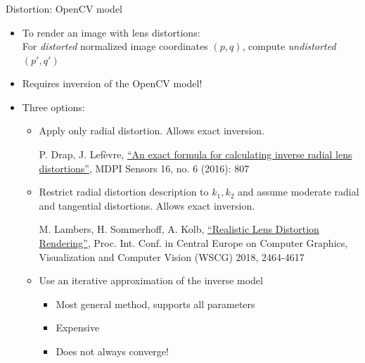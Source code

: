 \documentclass[utf8,stillsansserifmath,fleqn,t]{beamer}
\newcommand{\literature}[1]{{\tiny #1 \par}}
\begin{document}
\begin{frame}[label=distortion-opencv]
\frametitle{\insertsection}
Distortion: OpenCV model
\begin{itemize}
\item To render an image with lens distortions:\\
    For \emph{distorted} normalized image coordinates $(p,q)$, compute \emph{undistorted}
    $(p',q')$
\item Requires inversion of the OpenCV model!
\item Three options:
\begin{itemize}
\item Apply only radial distortion. Allows exact inversion.\\
\literature{P. Drap, J. Lefèvre, \href{https://doi.org/10.3390/s16060807}{``An
exact formula for calculating inverse radial lens distortions''}, MDPI Sensors 16, no. 6 (2016): 807}
\item Restrict radial distortion description to $k_1, k_2$ and assume moderate
radial and tangential distortions. Allows exact inversion.\\
\literature{M. Lambers, H. Sommerhoff, A. Kolb, \href{http://wscg.zcu.cz/wscg2018/2018-WSCG-Papers-Separated.html}{``Realistic Lens
Distortion Rendering''}, Proc. Int. Conf. in Central Europe on Computer
Graphics, Visualization and Computer Vision (WSCG) 2018, 2464-4617}
\item Use an iterative approximation of the inverse model
    \begin{itemize}
    \item Most general method, supports all parameters
    \item Expensive
    \item Does not always converge!
    \end{itemize}
\end{itemize}
\end{itemize}
\end{frame}
\end{document}
